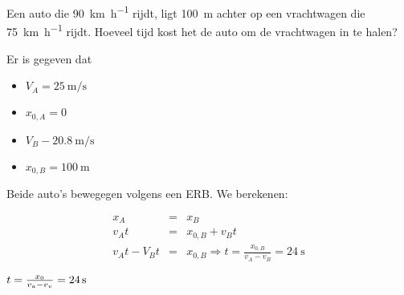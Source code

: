 \documentclass{ximera}
\begin{document}
\begin{exercise}
    Een auto die \SI{90}{\kilo\meter\per\hour} rijdt, ligt \SI{100}{m} achter op een vrachtwagen die \SI{75}{\kilo\meter\per\hour} rijdt. Hoeveel tijd kost het de auto om de vrachtwagen in te halen? 
    \begin{oplossing}
    Er is gegeven dat 
    \begin{itemize}
        \item \(V_A = \SI{25}{\meter\per\second}\)
        \item \(x_{0,A} = 0\)
        \item \(V_B - \SI{20.8}{\meter\per\second}\)
        \item \(x_{0,B} = \SI{100}{\meter}\)
    \end{itemize}

    Beide auto's bewegegen volgens een ERB. We berekenen: 

    \[
    \begin{array}{rcl}
        x_A &=& x_B\\
        v_A t &=& x_{0,B} + v_B t \\
        v_A t - V_B t &=& x_{0,B} \Rightarrow t = \frac{x_{0,B}}{v_A - v_B} = \SI{24}{\second}
        
    \end{array}\]


        $t=\frac{x_0}{v_a-v_v}=24\rm\,s$
    \end{oplossing}
\end{exercise}
\end{document}
